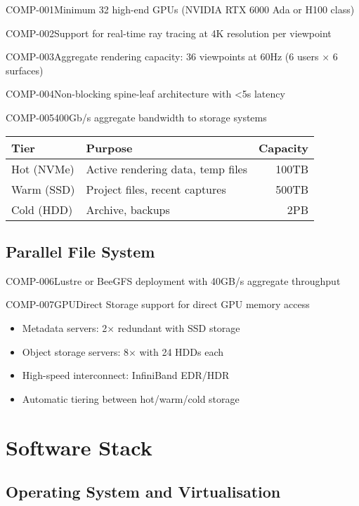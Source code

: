 \begin{requirement}{COMP-001}{Minimum 32 high-end GPUs (NVIDIA RTX 6000 Ada or H100 class)}
\begin{requirement}{COMP-002}{Support for real-time ray tracing at 4K resolution per viewpoint}
\begin{requirement}{COMP-003}{Aggregate rendering capacity: 36 viewpoints at 60Hz (6 users × 6 surfaces)}
\begin{requirement}{COMP-004}{Non-blocking spine-leaf architecture with <5\textmu s latency}
\begin{requirement}{COMP-005}{400Gb/s aggregate bandwidth to storage systems}
\begin{table}[H]
\centering
\begin{tabularx}{\textwidth}{@{}lXr@{}}
\toprule
\textbf{Tier} & \textbf{Purpose} & \textbf{Capacity} \\
\midrule
Hot (NVMe) & Active rendering data, temp files & 100TB \\
Warm (SSD) & Project files, recent captures & 500TB \\
Cold (HDD) & Archive, backups & 2PB \\
\bottomrule
\end{tabularx}
\end{table}

\subsection{Parallel File System}

\begin{requirement}{COMP-006}{Lustre or BeeGFS deployment with 40GB/s aggregate throughput}

\begin{requirement}{COMP-007}{GPUDirect Storage support for direct GPU memory access}

\begin{itemize}
    \item Metadata servers: 2× redundant with SSD storage
    \item Object storage servers: 8× with 24 HDDs each
    \item High-speed interconnect: InfiniBand EDR/HDR
    \item Automatic tiering between hot/warm/cold storage
\end{itemize}

\section{Software Stack}

\subsection{Operating System and Virtualisation}


\end{requirement}
\end{requirement}
\end{requirement}
\end{requirement}
\end{requirement}
\end{requirement}
\end{requirement}
